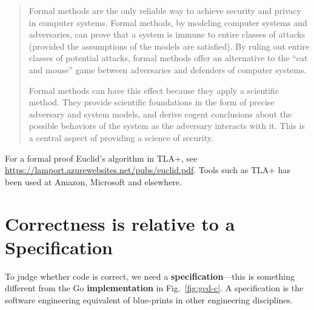 \documentclass[runningheads,12pt]{article}
\begin{document}
\begin{quote}
Formal methods are the only reliable way to achieve security and privacy in computer systems. Formal methods, by modeling computer systems and adversaries, can prove that a system is immune to entire classes of attacks (provided the assumptions of the models are satisfied). By ruling out entire classes of potential attacks, formal methods offer an alternative to the “cat and mouse” game between adversaries and defenders of computer systems.

Formal methods can have this effect because they apply a scientific method. They provide scientific foundations in the form of precise adversary and system models, and derive cogent conclusions about the possible behaviors of the system as the adversary interacts with it. This is a central aspect of providing a science of security.
\end{quote}

For a formal proof Euclid's algorithm in TLA+, see \url{https://lamport.azurewebsites.net/pubs/euclid.pdf}.  Tools such as TLA+ has been used at Amazon, Microsoft and elsewhere. 

\section{Correctness is relative to a Specification}

To judge whether code is correct, we need a \textbf{specification}---this is something different from the Go \textbf{implementation} in Fig.~\ref{fig:gcd-c}. A specification is the software engineering equivalent of blue-prints in other engineering disciplines.
\end{document}
